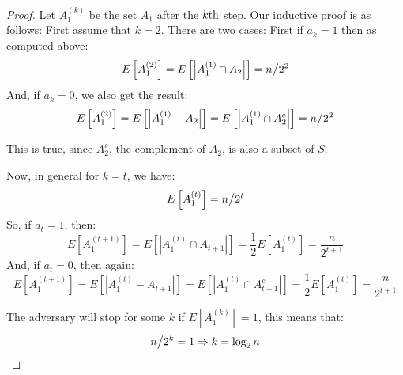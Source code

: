 \documentclass{llncs}
\begin{document}
\begin{proof}
Let ${A_1^{\left( k \right)} }$ be the set ${A_1 }$ after the $k{\rm{th}}$ step. Our inductive proof is as follows:
First assume that $k=2$. There are two cases: First if  $a_k  = 1$ then as computed above:
\[
E\left[ {A_1^{\left( 2 \right)} } \right] = E\left[ {\left| {A_1^{\left( 1 \right)}  \cap A_2 } \right|} \right] = {n \mathord{\left/
 {\vphantom {n {2^2 }}} \right.
 \kern-\nulldelimiterspace} {2^2 }}
\]
And, if $a_k  = 0$, we also get the result:
\[
E\left[ {A_1^{\left( 2 \right)} } \right] = E\left[ {\left| {A_1^{\left( 1 \right)}  - A_2 } \right|} \right] = E\left[ {\left| {A_1^{\left( 1 \right)}  \cap A_2^c } \right|} \right] = {n \mathord{\left/
 {\vphantom {n {2^2 }}} \right.
 \kern-\nulldelimiterspace} {2^2 }}
\]

This is true, since ${A_2^c }$, the complement of ${A_2 }$, is also a subset of $S$. 

Now, in general for $k=t$, we have:
\[
E\left[ {A_1^{\left( t \right)} } \right] = {n \mathord{\left/
 {\vphantom {n {2^t }}} \right.
 \kern-\nulldelimiterspace} {2^t }}
\]
So, if $a_t  = 1$, then:
\[
E\left[ {A_1^{\left( {t + 1} \right)} } \right] = E\left[ {\left| {A_1^{\left( t \right)}  \cap A_{t + 1} } \right|} \right] = \frac{1}{2}E\left[ {A_1^{\left( t \right)} } \right] = \frac{n}{{2^{t + 1} }}
\]
And, if $a_t  = 0$, then again:
\[
E\left[ {A_1^{\left( {t + 1} \right)} } \right] = E\left[ {\left| {A_1^{\left( t \right)}  - A_{t + 1} } \right|} \right] = E\left[ {\left| {A_1^{\left( t \right)}  \cap A_{t + 1}^c } \right|} \right] = \frac{1}{2}E\left[ {A_1^{\left( t \right)} } \right] = \frac{n}{{2^{t + 1} }}
\]

The adversary will stop for some $k$ if $E\left[ {A_1^{\left( k \right)} } \right] = 1$, this means that:
\[
{n \mathord{\left/
 {\vphantom {n {2^k }}} \right.
 \kern-\nulldelimiterspace} {2^k }} = 1 \Rightarrow k = \log _2 n
\]
\end{proof}
\end{document}
